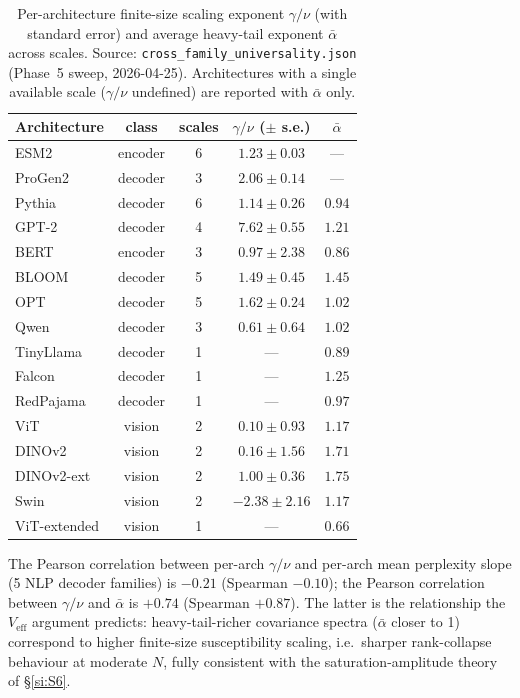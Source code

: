 \documentclass[11pt,a4paper]{article}
\begin{document}
\begin{table}[h]
\centering
\small
\caption{Per-architecture finite-size scaling exponent
$\gamma/\nu$ (with standard error) and average heavy-tail
exponent $\bar\alpha$ across scales. Source:
\texttt{cross\_family\_universality.json} (Phase~5 sweep,
2026-04-25). Architectures with a single available scale
($\gamma/\nu$ undefined) are reported with $\bar\alpha$ only.}
\label{tab:S14_gn}
\begin{tabular}{lcccc}
\toprule
Architecture & class & scales & $\gamma/\nu$ ($\pm$ s.e.) & $\bar\alpha$ \\
\midrule
ESM2     & encoder & 6 & $1.23 \pm 0.03$ & --- \\
ProGen2  & decoder & 3 & $2.06 \pm 0.14$ & --- \\
Pythia   & decoder & 6 & $1.14 \pm 0.26$ & $0.94$ \\
GPT-2    & decoder & 4 & $7.62 \pm 0.55$ & $1.21$ \\
BERT     & encoder & 3 & $0.97 \pm 2.38$ & $0.86$ \\
BLOOM    & decoder & 5 & $1.49 \pm 0.45$ & $1.45$ \\
OPT      & decoder & 5 & $1.62 \pm 0.24$ & $1.02$ \\
Qwen     & decoder & 3 & $0.61 \pm 0.64$ & $1.02$ \\
TinyLlama  & decoder & 1 & ---           & $0.89$ \\
Falcon     & decoder & 1 & ---           & $1.25$ \\
RedPajama  & decoder & 1 & ---           & $0.97$ \\
ViT        & vision  & 2 & $0.10 \pm 0.93$ & $1.17$ \\
DINOv2     & vision  & 2 & $0.16 \pm 1.56$ & $1.71$ \\
DINOv2-ext & vision  & 2 & $1.00 \pm 0.36$ & $1.75$ \\
Swin       & vision  & 2 & $-2.38 \pm 2.16$ & $1.17$ \\
ViT-extended & vision & 1 & ---           & $0.66$ \\
\bottomrule
\end{tabular}
\end{table}

The Pearson correlation between per-arch $\gamma/\nu$ and per-arch
mean perplexity slope (5 NLP decoder families) is $-0.21$
(Spearman $-0.10$); the Pearson correlation between $\gamma/\nu$
and $\bar\alpha$ is $+0.74$ (Spearman $+0.87$). The latter is the
relationship the $V_\mathrm{eff}$ argument predicts:
heavy-tail-richer covariance spectra ($\bar\alpha$ closer to 1)
correspond to higher finite-size susceptibility scaling, i.e.\
sharper rank-collapse behaviour at moderate $N$, fully consistent
with the saturation-amplitude theory of \S\ref{si:S6}.
\end{document}

